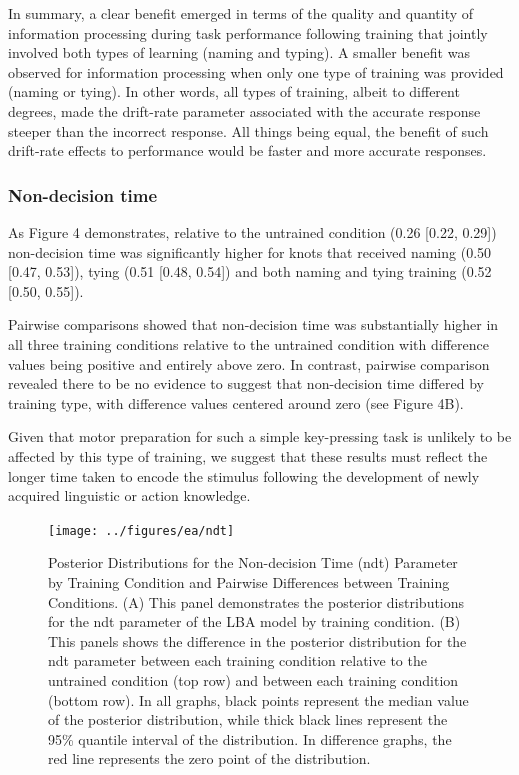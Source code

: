 \documentclass[
  man, donotrepeattitle,floatsintext]{apa6}
\begin{document}
In summary, a clear benefit emerged in terms of the quality and quantity of information processing during task performance following training that jointly involved both types of learning (naming and typing). A smaller benefit was observed for information processing when only one type of training was provided (naming or tying). In other words, all types of training, albeit to different degrees, made the drift-rate parameter associated with the accurate response steeper than the incorrect response. All things being equal, the benefit of such drift-rate effects to performance would be faster and more accurate responses.

\subsubsection{Non-decision time}\label{non-decision-time}

As Figure 4 demonstrates, relative to the untrained condition (0.26 {[}0.22, 0.29{]}) non-decision time was significantly higher for knots that received naming (0.50 {[}0.47, 0.53{]}), tying (0.51 {[}0.48, 0.54{]}) and both naming and tying training (0.52 {[}0.50, 0.55{]}).

Pairwise comparisons showed that non-decision time was substantially higher in all three training conditions relative to the untrained condition with difference values being positive and entirely above zero. In contrast, pairwise comparison revealed there to be no evidence to suggest that non-decision time differed by training type, with difference values centered around zero (see Figure 4B).

Given that motor preparation for such a simple key-pressing task is unlikely to be affected by this type of training, we suggest that these results must reflect the longer time taken to encode the stimulus following the development of newly acquired linguistic or action knowledge.



\begin{figure}[H]

{\centering \texttt{[image: ../figures/ea/ndt]} 

}

\caption{Posterior Distributions for the Non-decision Time (ndt) Parameter by Training Condition and Pairwise Differences between Training Conditions. (A) This panel demonstrates the posterior distributions for the ndt parameter of the LBA model by training condition. (B) This panels shows the difference in the posterior distribution for the ndt parameter between each training condition relative to the untrained condition (top row) and between each training condition (bottom row). In all graphs, black points represent the median value of the posterior distribution, while thick black lines represent the 95\% quantile interval of the distribution. In difference graphs, the red line represents the zero point of the distribution.}\label{fig:ndt-plot}
\end{figure}
\end{document}
